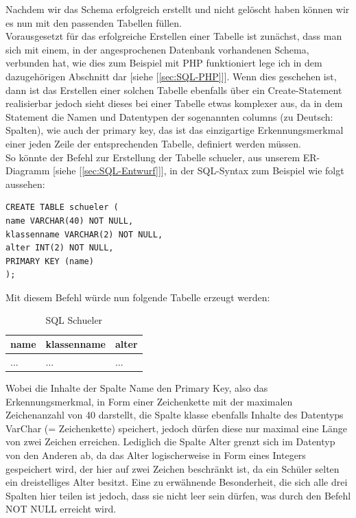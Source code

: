 \documentclass[12pt,a4paper,bibliography=totocnumbered,listof=totocnumbered]{scrartcl}
\begin{document}
Nachdem wir das Schema erfolgreich erstellt und nicht gelöscht haben können wir es nun mit den passenden Tabellen füllen.\\
Vorausgesetzt für das erfolgreiche Erstellen einer Tabelle ist zunächst, dass man sich mit einem, in der angesprochenen Datenbank vorhandenen Schema, verbunden hat, wie dies zum Beispiel mit PHP funktioniert lege ich in dem dazugehörigen Abschnitt dar [siehe [\ref{sec:SQL-PHP}]]. 
Wenn dies geschehen ist, dann ist das Erstellen einer solchen Tabelle ebenfalls über ein \glqq Create-Statement\grqq{} realisierbar jedoch sieht dieses bei einer Tabelle etwas komplexer aus, da in dem Statement die Namen und Datentypen der sogenannten \glqq columns\grqq{} (zu Deutsch: Spalten), wie auch der \glqq primary key\grqq{}, das ist das einzigartige Erkennungsmerkmal einer jeden Zeile der entsprechenden Tabelle, definiert werden müssen.\\
 

So könnte der Befehl zur Erstellung der Tabelle \glqq schueler\grqq{}, aus unserem ER-Diagramm [siehe [\ref{sec:SQL-Entwurf}]], in der SQL-Syntax zum Beispiel wie folgt aussehen:
\\
\vspace{1em}
\begin{lstlisting}[caption= SQL Create Table, label=lst:sql-create-table]
CREATE TABLE schueler (
name VARCHAR(40) NOT NULL, 
klassenname VARCHAR(2) NOT NULL, 
alter INT(2) NOT NULL,
PRIMARY KEY (name)
);
\end{lstlisting}

Mit diesem Befehl würde nun folgende Tabelle erzeugt werden:

\vspace{1em}
\begin{table}[!h]
	\centering
	\begin{tabular}{|l|l|l|}
		\hline
		\textbf{name} & \textbf{klassenname} & \textbf{alter}\\
		\hline
		... & ... & ...\\
		
	\end{tabular}
	\caption{SQL Schueler}
	\label{tab:sql-schueler}
\end{table}

Wobei die Inhalte der Spalte \glqq Name\grqq{} den Primary Key, also das Erkennungsmerkmal, in Form einer Zeichenkette mit der maximalen Zeichenanzahl von 40 darstellt, die Spalte \glqq klasse\grqq{} ebenfalls Inhalte des Datentyps VarChar (= Zeichenkette) speichert, jedoch dürfen diese nur maximal eine Länge von zwei Zeichen erreichen.
Lediglich die Spalte \glqq Alter\grqq{} grenzt sich im Datentyp von den Anderen ab, da das Alter logischerweise in Form eines Integers gespeichert wird, der hier auf zwei Zeichen beschränkt ist, da ein Schüler selten ein dreistelliges Alter besitzt. Eine zu erwähnende Besonderheit, die sich alle drei Spalten hier teilen ist jedoch, dass sie nicht leer sein dürfen, was durch den Befehl \glqq NOT NULL\grqq{} erreicht wird.
\end{document}
